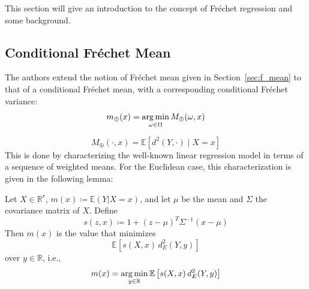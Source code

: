 This section will give an introduction to the concept of Fréchet regression
and some background.

\subsection{Conditional Fréchet Mean}
\label{sec:cond_fmean}
The authors extend the notion of Fréchet mean given in Section~\ref{sec:f_mean} to that
of a conditional Fréchet mean, with a corresponding conditional Fréchet variance:
\begin{equation}
    m_\oplus(x) = \operatorname*{arg\,min}_{\omega \in \Omega} M_\oplus(\omega, x)
\end{equation}

\begin{equation}
    M_\oplus(\cdot, x) = \mathbb{E} \left[ d^2(Y, \cdot) \mid X = x \right]
\end{equation}
This is done by characterizing the well-known linear regression model in terms of a
sequence of weighted means. For the Euclidean case, this characterization is given in
the following lemma:
\begin{lemma}
    \label{lemma:sequence_weights}
    Let \( X \in \mathbb{R}^r \), \( m(x) \coloneqq \mathbb{E}(Y | X = x) \), and let \( \mu \) 
    be the mean and \( \Sigma \) the covariance matrix of \( X \). Define
    \[
        s(z, x) \coloneqq 1 + (z - \mu)^T \Sigma^{-1} (x - \mu)
    \]
    Then \( m(x) \) is the value that minimizes 
    \[
        \mathbb{E} \left[ s(X, x) \, d_E^2(Y, y)   \right]
    \]
    over \( y \in \mathbb{R} \), i.e.,
    \begin{equation}
        m(x) = \operatorname*{arg\,min}_{y \in \mathbb{R}} \mathbb{E} \left[ s(X, x) \, d_E^2(Y, y) \right]
    \end{equation}
\end{lemma}
